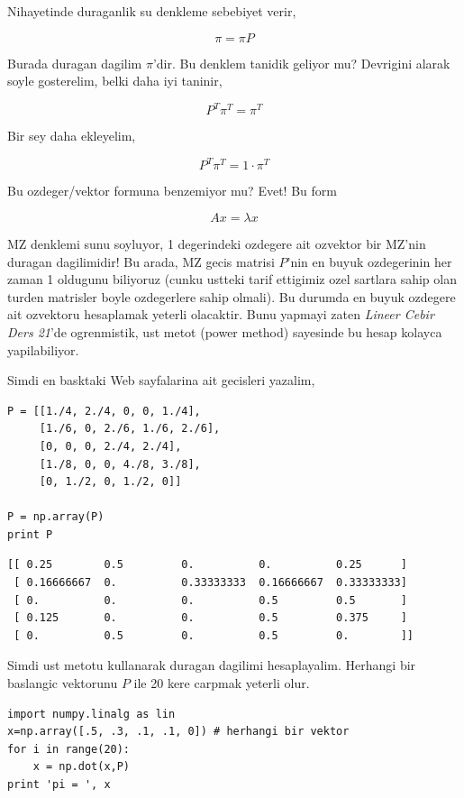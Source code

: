\documentclass[12pt,fleqn]{article}\usepackage{../common}
\begin{document}
Nihayetinde duraganlik su denkleme sebebiyet verir, 

$$ \pi = \pi P $$

Burada duragan dagilim $\pi$'dir. Bu denklem tanidik geliyor mu?  Devrigini
alarak soyle gosterelim, belki daha iyi taninir, 

$$ P^T\pi^T = \pi^T $$

Bir sey daha ekleyelim, 

$$ P^T\pi^T = 1 \cdot \pi^T $$

Bu ozdeger/vektor formuna benzemiyor mu? Evet! Bu form 

$$ Ax = \lambda x $$

MZ denklemi sunu soyluyor, 1 degerindeki ozdegere ait ozvektor bir MZ'nin
duragan dagilimidir! Bu arada, MZ gecis matrisi $P$'nin en buyuk
ozdegerinin her zaman 1 oldugunu biliyoruz (cunku ustteki tarif ettigimiz
ozel sartlara sahip olan turden matrisler boyle ozdegerlere sahip
olmali). Bu durumda en buyuk ozdegere ait ozvektoru hesaplamak yeterli
olacaktir. Bunu yapmayi zaten {\em Lineer Cebir Ders 21}'de ogrenmistik,
ust metot (power method) sayesinde bu hesap kolayca yapilabiliyor.

Simdi en basktaki Web sayfalarina ait gecisleri yazalim,

\begin{verbatim}
P = [[1./4, 2./4, 0, 0, 1./4],
     [1./6, 0, 2./6, 1./6, 2./6],
     [0, 0, 0, 2./4, 2./4],
     [1./8, 0, 0, 4./8, 3./8],
     [0, 1./2, 0, 1./2, 0]]

P = np.array(P)
print P
\end{verbatim}

\begin{verbatim}
[[ 0.25        0.5         0.          0.          0.25      ]
 [ 0.16666667  0.          0.33333333  0.16666667  0.33333333]
 [ 0.          0.          0.          0.5         0.5       ]
 [ 0.125       0.          0.          0.5         0.375     ]
 [ 0.          0.5         0.          0.5         0.        ]]
\end{verbatim}

Simdi ust metotu kullanarak duragan dagilimi hesaplayalim. Herhangi bir
baslangic vektorunu $P$ ile 20 kere  carpmak yeterli olur.

\begin{verbatim}
import numpy.linalg as lin
x=np.array([.5, .3, .1, .1, 0]) # herhangi bir vektor
for i in range(20): 
    x = np.dot(x,P)
print 'pi = ', x
\end{verbatim}
\end{document}
